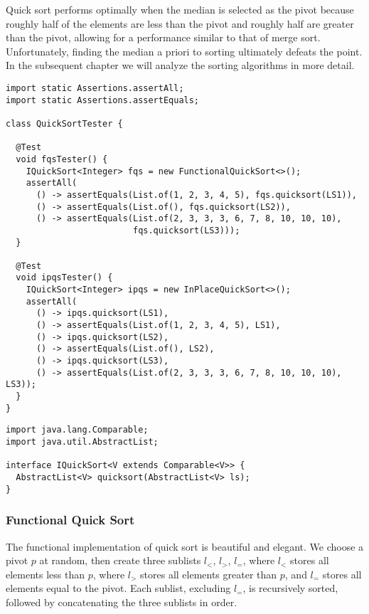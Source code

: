 Quick sort performs optimally when the median is selected as the pivot because roughly half of the elements are less than the pivot and roughly half are greater than the pivot, allowing for a performance similar to that of merge sort. Unfortunately, finding the median a priori to sorting ultimately defeats the point. In the subsequent chapter we will analyze the sorting algorithms in more detail.

\begin{lstlisting}[language=MyJava]
import static Assertions.assertAll;
import static Assertions.assertEquals;

class QuickSortTester {

  @Test
  void fqsTester() {
    IQuickSort<Integer> fqs = new FunctionalQuickSort<>();
    assertAll(
      () -> assertEquals(List.of(1, 2, 3, 4, 5), fqs.quicksort(LS1)),
      () -> assertEquals(List.of(), fqs.quicksort(LS2)),
      () -> assertEquals(List.of(2, 3, 3, 3, 6, 7, 8, 10, 10, 10), 
                         fqs.quicksort(LS3)));
  }

  @Test
  void ipqsTester() {
    IQuickSort<Integer> ipqs = new InPlaceQuickSort<>();
    assertAll(
      () -> ipqs.quicksort(LS1),
      () -> assertEquals(List.of(1, 2, 3, 4, 5), LS1),
      () -> ipqs.quicksort(LS2),
      () -> assertEquals(List.of(), LS2),
      () -> ipqs.quicksort(LS3),
      () -> assertEquals(List.of(2, 3, 3, 3, 6, 7, 8, 10, 10, 10), LS3));
  }
}
\end{lstlisting}

\begin{lstlisting}[language=MyJava]
import java.lang.Comparable;
import java.util.AbstractList;

interface IQuickSort<V extends Comparable<V>> {
  AbstractList<V> quicksort(AbstractList<V> ls);
}
\end{lstlisting}

\subsubsection*{Functional Quick Sort}
The functional implementation of quick sort is beautiful and elegant. We choose a pivot $p$ at random, then create three sublists $l_<$, $l_>$, $l_=$, where $l_<$ stores all elements less than $p$, where $l_>$ stores all elements greater than $p$, and $l_=$ stores all elements equal to the pivot. Each sublist, excluding $l_=$, is recursively sorted, followed by concatenating the three sublists in order. 

